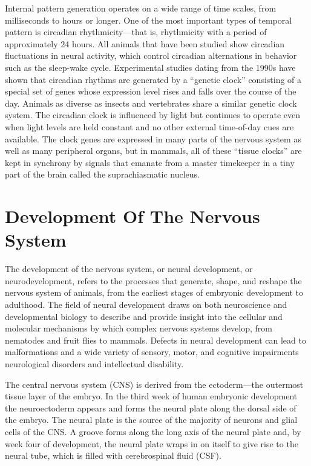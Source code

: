 Internal pattern generation operates on a wide range of time scales, from milliseconds to hours or longer. One of the most important types of temporal pattern is circadian rhythmicity---that is, rhythmicity with a period of approximately 24 hours. All animals that have been studied show circadian fluctuations in neural activity, which control circadian alternations in behavior such as the sleep-wake cycle. Experimental studies dating from the 1990s have shown that circadian rhythms are generated by a ``genetic clock'' consisting of a special set of genes whose expression level rises and falls over the course of the day. Animals as diverse as insects and vertebrates share a similar genetic clock system. The circadian clock is influenced by light but continues to operate even when light levels are held constant and no other external time-of-day cues are available. The clock genes are expressed in many parts of the nervous system as well as many peripheral organs, but in mammals, all of these ``tissue clocks'' are kept in synchrony by signals that emanate from a master timekeeper in a tiny part of the brain called the suprachiasmatic nucleus.

\hypertarget{development-of-the-nervous-system-1}{%
\chapter{Development Of The Nervous System}\label{development-of-the-nervous-system-1}}

The development of the nervous system, or neural development, or neurodevelopment, refers to the processes that generate, shape, and reshape the nervous system of animals, from the earliest stages of embryonic development to adulthood. The field of neural development draws on both neuroscience and developmental biology to describe and provide insight into the cellular and molecular mechanisms by which complex nervous systems develop, from nematodes and fruit flies to mammals. Defects in neural development can lead to malformations and a wide variety of sensory, motor, and cognitive impairments neurological disorders and intellectual disability.

The central nervous system (CNS) is derived from the ectoderm---the outermost tissue layer of the embryo. In the third week of human embryonic development the neuroectoderm appears and forms the neural plate along the dorsal side of the embryo. The neural plate is the source of the majority of neurons and glial cells of the CNS. A groove forms along the long axis of the neural plate and, by week four of development, the neural plate wraps in on itself to give rise to the neural tube, which is filled with cerebrospinal fluid (CSF).


